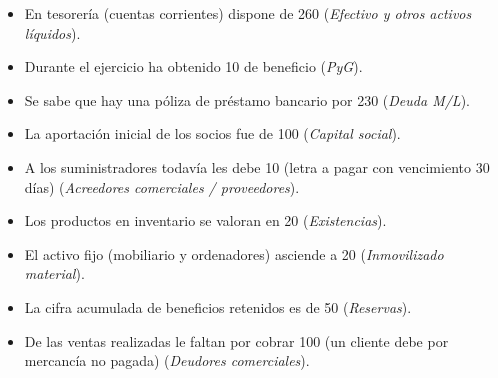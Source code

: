 \documentclass[nochap,palatino,notitlepage]{apuntes}
\begin{document}
\begin{itemize}
\item En tesorería (cuentas corrientes) dispone de 260 (\textit{Efectivo y otros activos líquidos}).
\item Durante el ejercicio ha obtenido 10 de beneficio (\textit{PyG}).
\item Se sabe que hay una póliza de préstamo bancario por 230 (\textit{Deuda M/L}).
\item La aportación inicial de los socios fue de 100 (\textit{Capital social}).
\item A los suministradores todavía les debe 10 (letra a pagar con vencimiento 30 días) (\textit{Acreedores comerciales / proveedores}).
\item Los productos en inventario se valoran en 20 (\textit{Existencias}).
\item El activo fijo (mobiliario y ordenadores) asciende a 20 (\textit{Inmovilizado material}).
\item La cifra acumulada de beneficios retenidos es de 50 (\textit{Reservas}).
\item De las ventas realizadas le faltan por cobrar 100 (un cliente debe por mercancía no pagada) (\textit{Deudores comerciales}).
\end{itemize}
\end{document}
